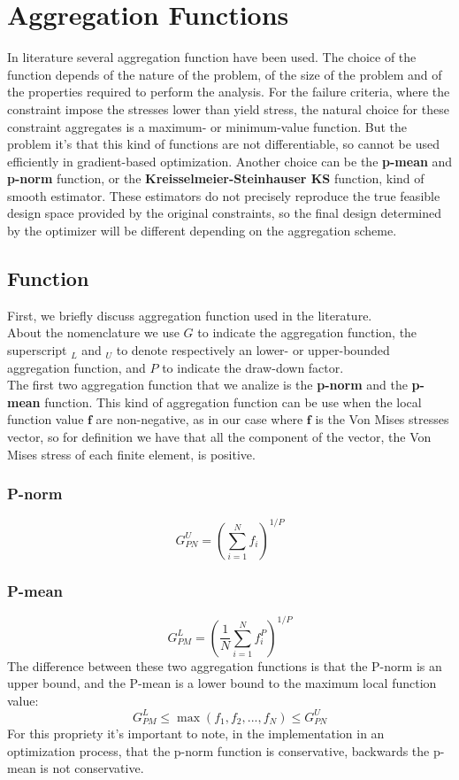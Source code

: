 \section{Aggregation Functions}
In literature several aggregation function have been used. The choice of the function depends of the nature of the problem, of the size of the problem and of the properties required to perform the analysis. For the failure criteria, where the constraint impose the stresses lower than yield stress, the natural choice for these constraint aggregates is a maximum- or minimum-value function. But the problem it's that this kind of functions are not differentiable, so cannot be used efficiently in gradient-based optimization. Another choice can be the \textbf{p-mean} and \textbf{p-norm} function, or the \textbf{Kreisselmeier-Steinhauser KS} function, kind of smooth estimator. These estimators do not precisely reproduce the true feasible design space provided by the original constraints, so the final design determined by the optimizer will be different depending on the aggregation scheme. \cite{lambe} 
\subsection{Function}
First, we briefly discuss aggregation function used in the literature.\\
About the nomenclature we use $G$ to indicate the aggregation function, the superscript $_L$ and $_U$ to denote respectively an lower- or upper-bounded aggregation function, and $P$ to indicate the draw-down factor.\\
The first two aggregation function that we analize is the \textbf{p-norm} and the \textbf{p-mean} function. This kind of aggregation function can be use when the local function value $\mathbf{f}$ are non-negative, as in our case where $\mathbf{f}$ is the Von Mises stresses vector, so for definition we have that all the component of the vector, the Von Mises stress of each finite element, is positive.
\subsubsection{P-norm}
\begin{equation}
G_{PN}^U=\left(\sum_{i=1}^{N}f_i\right)^{1/P}
\end{equation}
\subsubsection{P-mean}
\begin{equation}
G_{PM}^L=\left(\frac{1}{N}\sum_{i=1}^{N}f_i^P\right)^{1/P}
\end{equation}
The difference between these two aggregation functions is that the P-norm is an upper bound, and the P-mean is a lower bound to the maximum local function value:
\begin{equation*}
G_{PM}^L \le \max(f_1,f_2,...,f_N)\le G_{PN}^U
\end{equation*}
For this propriety it's important to note, in the implementation in an optimization process, that the p-norm function is conservative, backwards the p-mean is not conservative.
